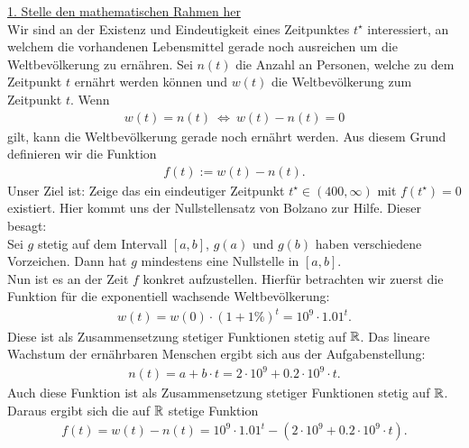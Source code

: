 \underline{1. Stelle den mathematischen Rahmen her}\\
Wir sind an der Existenz und Eindeutigkeit eines Zeitpunktes $ t^\star $ interessiert, an welchem die vorhandenen Lebensmittel gerade noch ausreichen um die Weltbevölkerung zu ernähren. Sei $ n(t)  $ die Anzahl an Personen, welche zu dem Zeitpunkt $ t $ ernährt werden können und $ w(t) $ die Weltbevölkerung zum Zeitpunkt $ t $.
Wenn 
\begin{align*}
	w(t) = n(t) \ \Leftrightarrow \ w(t) - n(t) = 0
\end{align*}
gilt, kann die Weltbevölkerung gerade noch ernährt werden. Aus diesem Grund definieren wir die Funktion
\begin{align*}
	f(t) := w(t) - n(t).
\end{align*}
Unser Ziel ist: Zeige das ein eindeutiger Zeitpunkt $ t^\star \in (400, \infty) $ mit $ f(t^\star) = 0 $ existiert.
Hier kommt uns der Nullstellensatz von Bolzano zur Hilfe. Dieser besagt: \\
Sei $ g  $ stetig auf dem Intervall $  [a,b] $, $ g(a) $ und $ g(b) $ haben verschiedene Vorzeichen. Dann hat $ g $ mindestens eine Nullstelle in $ [a,b] $.\\
Nun ist es an der Zeit $ f $ konkret aufzustellen. Hierfür betrachten wir zuerst die Funktion für die exponentiell wachsende Weltbevölkerung:
\begin{align*}
	w(t) = w(0) \cdot (1 + 1 \% )^t= 10^9 \cdot 1.01^t.
\end{align*}
Diese ist als Zusammensetzung stetiger Funktionen stetig auf $ \mathbb{R} $. Das lineare Wachstum der ernährbaren Menschen ergibt sich aus der Aufgabenstellung:
\begin{align*}
	n(t) = a + b \cdot t
	= 2 \cdot 10^9 + 0.2 \cdot 10^9 \cdot t.
\end{align*}
Auch diese Funktion ist als Zusammensetzung stetiger Funktionen stetig auf $ \mathbb{R} $.
Daraus ergibt sich die auf $ \mathbb{R} $ stetige Funktion 
\begin{align*}
	f(t) = w(t) - n(t)
	=
	10^9 \cdot 1.01^t - (2 \cdot 10^9 + 0.2 \cdot 10^9 \cdot t).
\end{align*}

